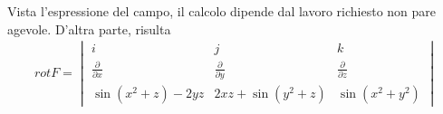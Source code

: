 \begin{svol}
  Vista l'espressione del campo, il calcolo dipende dal lavoro richiesto non pare agevole. D'altra parte, risulta
  \begin{equation*}
    \begin{matrix}
	rot F= \begin{vmatrix}
            i & j & k\\
            \frac{\partial}{\partial x} & \frac{\partial}{\partial y} &  \frac{\partial}{\partial z}\\
            \sin(x^2+z)-2yz & 2xz+\sin(y^2+z) & \sin (x^2+y^2)
        \end{vmatrix}
    \end{matrix}
  \end{equation*}
    
\end{svol}

  